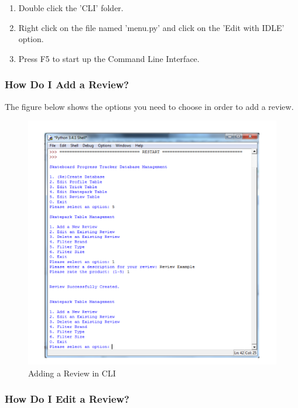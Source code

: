 \begin{enumerate}
\item Double click the 'CLI' folder.
\item Right click on the file named 'menu.py' and click on the 'Edit with IDLE' option.
\item Press F5 to start up the Command Line Interface.
\end{enumerate}

\subsubsection{How Do I Add a Review?} \label{AddReview} 

The figure below shows the options you need to choose in order to add a review. 

\begin{figure}[H]
    \includegraphics[width=\textwidth]{./Manual/Images/AddReview.pdf}
    \caption{Adding a Review in CLI} \label{fig:Add Review}
\end{figure}



\subsubsection{How Do I Edit a Review?} \label{EditReview}

